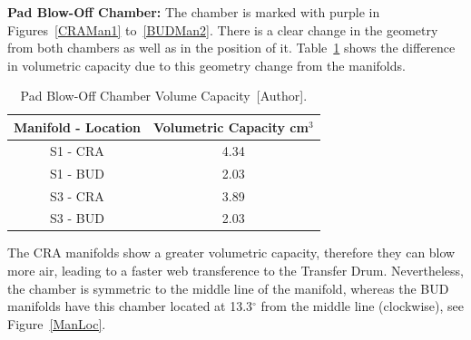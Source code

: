 \textbf{Pad Blow-Off Chamber:} The chamber is marked with purple in Figures~\ref{CRAMan1} to~\ref{BUDMan2}. There is a clear change in the geometry from both chambers as well as in the position of it. Table~\ref{PadVacuumVol2} shows the difference in volumetric capacity due to this geometry change from the manifolds.
    \begin{table}[H]
    \centering
    \scriptsize
    \begin{tabular}{cc}
    \hline
    \textbf{Manifold - Location} & \textbf{Volumetric Capacity cm$^3$} \\ \hline
    S1 - CRA                     & 4.34                              \\
    S1 - BUD                     & 2.03                              \\
    S3 - CRA                     & 3.89                              \\
    S3 - BUD                     & 2.03                              \\ \hline
    \end{tabular}%
    \caption{Pad Blow-Off Chamber Volume Capacity~[Author].}
    \label{PadVacuumVol2}
    \end{table}

The CRA manifolds show a greater volumetric capacity, therefore they can blow more air, leading to a faster web transference to the Transfer Drum. Nevertheless, the chamber is symmetric to the middle line of the manifold, whereas the BUD manifolds have this chamber located at 13.3$^{\circ}$ from the middle line (clockwise), see Figure~\ref{ManLoc}.

